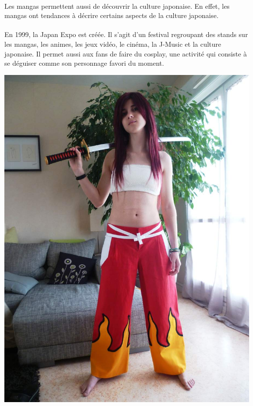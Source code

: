 \paragraph{} Les mangas permettent aussi de découvrir la culture japonaise. En
effet, les mangas ont tendances à décrire certains aspects de la culture
japonaise. 

\paragraph{} En 1999, la Japan Expo est créée. Il s’agit d’un festival
regroupant des stands sur les mangas, les animes, les jeux vidéo, le cinéma, la
J-Music et la culture japonaise. Il permet aussi aux fans de faire du cosplay,
une activité qui consiste à se déguiser comme son personnage favori du moment. 

\begin{center}
	\includegraphics[scale=0.3, angle=-90]{erza.jpg}
\end{center}

